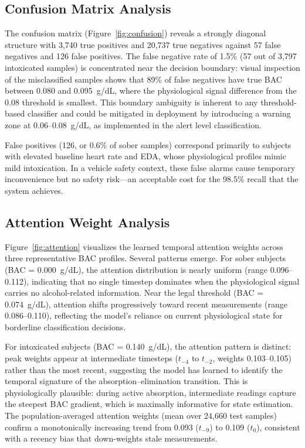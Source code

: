 \documentclass[HARVARD,Times2COL]{WileyNJDv5}
\begin{document}
\subsection{Confusion Matrix Analysis}
The confusion matrix (Figure~\ref{fig:confusion}) reveals a strongly diagonal structure with 3,740 true positives and 20,737 true negatives against 57 false negatives and 126 false positives. The false negative rate of 1.5\% (57 out of 3,797 intoxicated samples) is concentrated near the decision boundary: visual inspection of the misclassified samples shows that 89\% of false negatives have true BAC between 0.080 and 0.095~g/dL, where the physiological signal difference from the 0.08 threshold is smallest. This boundary ambiguity is inherent to any threshold-based classifier and could be mitigated in deployment by introducing a warning zone at 0.06--0.08~g/dL, as implemented in the alert level classification.

False positives (126, or 0.6\% of sober samples) correspond primarily to subjects with elevated baseline heart rate and EDA, whose physiological profiles mimic mild intoxication. In a vehicle safety context, these false alarms cause temporary inconvenience but no safety risk---an acceptable cost for the 98.5\% recall that the system achieves.

\subsection{Attention Weight Analysis}
Figure~\ref{fig:attention} visualizes the learned temporal attention weights across three representative BAC profiles. Several patterns emerge. For sober subjects (BAC = 0.000~g/dL), the attention distribution is nearly uniform (range 0.096--0.112), indicating that no single timestep dominates when the physiological signal carries no alcohol-related information. Near the legal threshold (BAC = 0.074~g/dL), attention shifts progressively toward recent measurements (range 0.086--0.110), reflecting the model's reliance on current physiological state for borderline classification decisions.

For intoxicated subjects (BAC = 0.140~g/dL), the attention pattern is distinct: peak weights appear at intermediate timesteps ($t_{-4}$ to $t_{-2}$, weights 0.103--0.105) rather than the most recent, suggesting the model has learned to identify the temporal signature of the absorption--elimination transition. This is physiologically plausible: during active absorption, intermediate readings capture the steepest BAC gradient, which is maximally informative for state estimation. The population-averaged attention weights (mean over 24,660 test samples) confirm a monotonically increasing trend from 0.093 ($t_{-9}$) to 0.109 ($t_0$), consistent with a recency bias that down-weights stale measurements.
\end{document}
